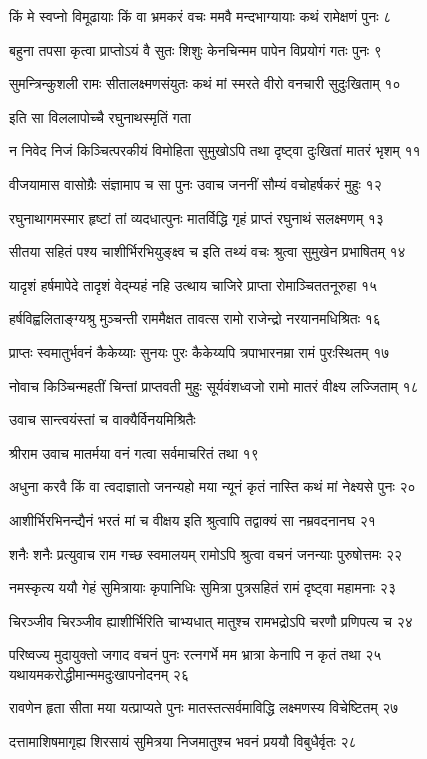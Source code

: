 किं मे स्वप्नो विमूढायाः किं वा भ्रमकरं वचः
ममवै मन्दभाग्यायाः कथं रामेक्षणं पुनः ८

बहुना तपसा कृत्वा प्राप्तोऽयं वै सुतः शिशुः
केनचिन्मम पापेन विप्रयोगं गतः पुनः ९

सुमन्त्रिन्कुशली रामः सीतालक्ष्मणसंयुतः
कथं मां स्मरते वीरो वनचारी सुदुःखिताम् १०

इति सा विललापोच्चै रघुनाथस्मृतिं गता

न निवेद निजं किञ्चित्परकीयं विमोहिता
सुमुखोऽपि तथा दृष्ट्वा दुःखितां मातरं भृशम् ११

वीजयामास वासोग्रैः संज्ञामाप च सा पुनः
उवाच जननीं सौम्यं वचोहर्षकरं मुहुः १२

रघुनाथागमस्मार हृष्टां तां व्यदधात्पुनः
मातर्विद्धि गृहं प्राप्तं रघुनाथं सलक्ष्मणम् १३

सीतया सहितं पश्य चाशीर्भिरभियुङ्क्ष्व च
इति तथ्यं वचः श्रुत्वा सुमुखेन प्रभाषितम् १४

यादृशं हर्षमापेदे तादृशं वेद्म्यहं नहि
उत्थाय चाजिरे प्राप्ता रोमाञ्चिततनूरुहा १५

हर्षविह्वलिताङ्ग्यश्रु मुञ्चन्ती राममैक्षत
तावत्स रामो राजेन्द्रो नरयानमधिश्रितः १६

प्राप्तः स्वमातुर्भवनं कैकेय्याः सुनयः पुरः
कैकेय्यपि त्रपाभारनम्रा रामं पुरःस्थितम् १७

नोवाच किञ्चिन्महतीं चिन्तां प्राप्तवती मुहुः
सूर्यवंशध्वजो रामो मातरं वीक्ष्य लज्जिताम् १८

उवाच सान्त्वयंस्तां च वाक्यैर्विनयमिश्रितैः

श्रीराम उवाच
मातर्मया वनं गत्वा सर्वमाचरितं तथा १९

अधुना करवै किं वा त्वदाज्ञातो जनन्यहो
मया न्यूनं कृतं नास्ति कथं मां नेक्ष्यसे पुनः २०

आशीर्भिरभिनन्द्यैनं भरतं मां च वीक्षय
इति श्रुत्वापि तद्वाक्यं सा नम्रवदनानघ २१

शनैः शनैः प्रत्युवाच राम गच्छ स्वमालयम्
रामोऽपि श्रुत्वा वचनं जनन्याः पुरुषोत्तमः २२

नमस्कृत्य ययौ गेहं सुमित्रायाः कृपानिधिः
सुमित्रा पुत्रसहितं रामं दृष्ट्वा महामनाः २३

चिरञ्जीव चिरञ्जीव ह्याशीर्भिरिति चाभ्यधात्
मातुश्च रामभद्रोऽपि चरणौ प्रणिपत्य च २४

परिष्वज्य मुदायुक्तो जगाद वचनं पुनः
रत्नगर्भे मम भ्रात्रा केनापि न कृतं तथा २५
यथायमकरोद्धीमान्ममदुःखापनोदनम् २६

रावणेन हृता सीता मया यत्प्राप्यते पुनः
मातस्तत्सर्वमाविद्धि लक्ष्मणस्य विचेष्टितम् २७

दत्तामाशिषमागृह्य शिरसायं सुमित्रया
निजमातुश्च भवनं प्रययौ विबुधैर्वृतः २८

